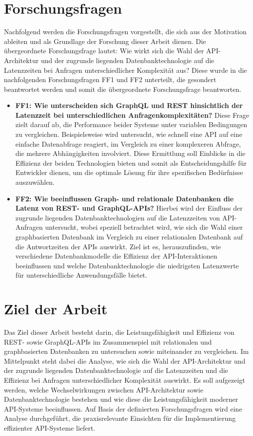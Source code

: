 \section{Forschungsfragen} %
\label{sec:forschungsfragen}
Nachfolgend werden die Forschungsfragen vorgestellt, die sich aus der Motivation ableiten und als Grundlage der Forschung dieser Arbeit dienen.
\newline
\noindent
Die übergeordnete Forschungsfrage lautet: Wie wirkt sich die Wahl der API-Architektur und der zugrunde liegenden Datenbanktechnologie auf die Latenzzeiten bei Anfragen unterschiedlicher Komplexität aus?
\newline
Diese wurde in die nachfolgenden Forschungsfragen FF1 und FF2 unterteilt, die gesondert beantwortet werden und somit die übergeordnete Forschungsfrage beantworten.
\begin{itemize}
	\item \textbf{FF1: Wie unterscheiden sich GraphQL und REST hinsichtlich der Latenzzeit bei unterschiedlichen Anfragenkomplexitäten?}  Diese Frage zielt darauf ab, die Performance beider Systeme unter variablen Bedingungen zu vergleichen. Beispielsweise wird untersucht, wie schnell eine API auf eine einfache Datenabfrage reagiert, im Vergleich zu einer komplexeren Abfrage, die mehrere Abhängigkeiten involviert. Diese Ermittlung soll Einblicke in die Effizienz der beiden Technologien bieten und somit als Entscheidungshilfe für Entwickler dienen, um die optimale Lösung für ihre spezifischen Bedürfnisse auszuwählen.
	\item \textbf{FF2: Wie beeinflussen Graph- und relationale Datenbanken die Latenz von REST- und GraphQL-APIs?} Hierbei wird der Einfluss der zugrunde liegenden Datenbanktechnologien auf die Latenzzeiten von API-Anfragen untersucht, wobei speziell betrachtet wird, wie sich die Wahl einer graphbasierten Datenbank im Vergleich zu einer relationalen Datenbank auf die Antwortzeiten der APIs auswirkt. Ziel ist es, herauszufinden, wie verschiedene Datenbankmodelle die Effizienz der API-Interaktionen beeinflussen und welche Datenbanktechnologie die niedrigsten Latenzwerte für unterschiedliche Anwendungsfälle bietet.
\end{itemize} 
\section{Ziel der Arbeit} %
\label{sec:zielderarbeit}
Das Ziel dieser Arbeit besteht darin, die Leistungsfähigkeit und Effizienz von REST- sowie GraphQL-APIs im Zusammenspiel mit relationalen und graphbasierten Datenbanken zu untersuchen sowie miteinander zu vergleichen. Im Mittelpunkt steht dabei die Analyse, wie sich die Wahl der API-Architektur und der zugrunde liegenden Datenbanktechnologie auf die Latenzzeiten und die Effizienz bei Anfragen unterschiedlicher Komplexität auswirkt. Es soll aufgezeigt werden, welche Wechselwirkungen zwischen API-Architektur sowie Datenbanktechnologie bestehen und wie diese die Leistungsfähigkeit moderner API-Systeme beeinflussen. Auf Basis der definierten Forschungsfragen wird eine Analyse durchgeführt, die praxisrelevante Einsichten für die Implementierung effizienter API-Systeme liefert.
\newpage
